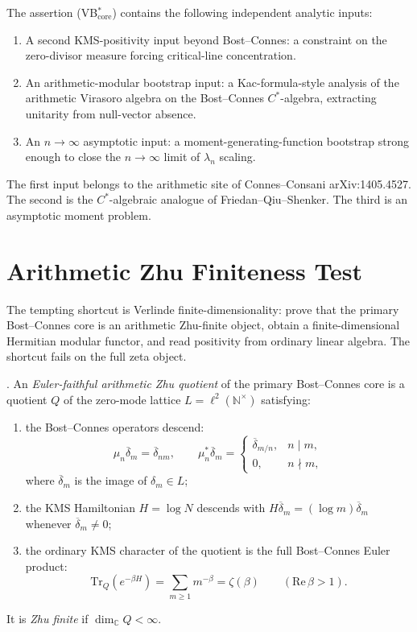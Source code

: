 \begin{remark}
\label{v4-arith:vb:rem:proof-strategy}
The assertion (VB\(^{*}_{\mathrm{core}}\)) contains the following
independent analytic inputs:
\begin{enumerate}
\item A second KMS-positivity input beyond Bost--Connes: a constraint
on the zero-divisor measure forcing critical-line concentration.
\item An arithmetic-modular bootstrap input: a Kac-formula-style
analysis of the arithmetic Virasoro algebra on the Bost--Connes
\(C^{*}\)-algebra, extracting unitarity from null-vector absence.
\item An \(n\to\infty\) asymptotic input: a moment-generating-function
bootstrap strong enough to close the \(n\to\infty\) limit of
\(\lambda_{n}\) scaling.
\end{enumerate}
The first input belongs to the arithmetic site of Connes--Consani
arXiv:1405.4527. The second is the \(C^{*}\)-algebraic analogue of
Friedan--Qiu--Shenker. The third is an asymptotic moment problem.
\end{remark}

\section{Arithmetic Zhu Finiteness Test}
\label{v4-arith:vb:zhu-finiteness-test}

The tempting shortcut is Verlinde finite-dimensionality: prove that the
primary Bost--Connes core is an arithmetic Zhu-finite object, obtain a
finite-dimensional Hermitian modular functor, and read positivity from
ordinary linear algebra. The shortcut fails on the full zeta object.

\begin{definition}
\label{v4-arith:vb:def:euler-faithful-zhu}
\ClaimStatusDefinitional. An \emph{Euler-faithful arithmetic Zhu
quotient} of the primary Bost--Connes core is a quotient \(Q\) of the
zero-mode lattice \(L=\ell^{2}(\mathbb{N}^{\times})\) satisfying:
\begin{enumerate}
\item the Bost--Connes operators descend:
\[
\mu_{n}\overline{\delta}_{m}=\overline{\delta}_{nm},\qquad
\mu_{n}^{*}\overline{\delta}_{m}=
\begin{cases}
\overline{\delta}_{m/n},& n\mid m,\\
0,& n\nmid m,
\end{cases}
\]
where \(\overline{\delta}_{m}\) is the image of
\(\delta_{m}\in L\);
\item the KMS Hamiltonian \(H=\log N\) descends with
\(H\overline{\delta}_{m}=(\log m)\overline{\delta}_{m}\) whenever
\(\overline{\delta}_{m}\neq0\);
\item the ordinary KMS character of the quotient is the full
Bost--Connes Euler product:
\[
\mathrm{Tr}_{Q}(e^{-\beta H})=\sum_{m\geq1}m^{-\beta}=\zeta(\beta)
\qquad(\mathrm{Re}\,\beta>1).
\]
\end{enumerate}
It is \emph{Zhu finite} if \(\dim_{\mathbb C}Q<\infty\).
\end{definition}

